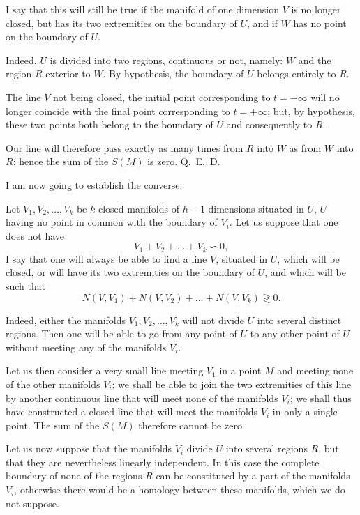 \documentclass{article}
\begin{document}
I say that this will still be true if the manifold of one dimension $V$ is no longer closed, but has its two extremities on the boundary of $U$, and if $W$ has no point on the boundary of $U$.

Indeed, $U$ is divided into two regions, continuous or not, namely: $W$ and the region $R$ exterior to $W$. By hypothesis, the boundary of $U$ belongs entirely to $R$.

The line $V$ not being closed, the initial point corresponding to $t = -\infty$ will no longer coincide with the final point corresponding to $t = +\infty$; but,
by hypothesis, these two points both belong to the boundary of $U$ and consequently to $R$.

Our line will therefore pass exactly as many times from $R$ into $W$ as from $W$ into $R$; hence the sum of the $S(M)$ is zero. Q.~E.~D.

I am now going to establish the converse.

Let $V_{1}, V_{2}, \ldots, V_{k}$ be $k$ closed manifolds of $h-1$ dimensions situated in $U$, $U$ having no point in common with the boundary of $V_{i}$. Let us suppose that one does not have
\[
V_{1} + V_{2} + \ldots + V_{k} \backsim 0,
\]
I say that one will always be able to find a line $V$, situated in $U$, which will be closed, or will have its two extremities on the boundary of $U$, and which will be such that
\[
N(V, V_{1}) + N(V, V_{2}) + \ldots + N(V, V_{k}) \gtrless 0.
\]

Indeed, either the manifolds $V_{1}, V_{2}, \ldots, V_{k}$ will not divide $U$ into several distinct regions. Then one will be able to go from any point of $U$ to any other point of $U$ without meeting any of the manifolds $V_{i}$.

Let us then consider a very small line meeting $V_{1}$ in a point $M$ and meeting none of the other manifolds $V_{i}$; we shall be able to join the two extremities of this line by another continuous line that will meet none of the manifolds $V_{i}$; we shall thus have constructed a closed line that will meet the manifolds $V_{i}$ in only a single point. The sum of the $S(M)$ therefore cannot be zero.

Let us now suppose that the manifolds $V_{i}$ divide $U$ into several regions $R$, but that they are nevertheless linearly independent. In this case the complete boundary of none of the regions $R$ can be constituted by a part of the manifolds $V_{i}$, otherwise there would be a homology between these manifolds, which we do not suppose.
\end{document}

